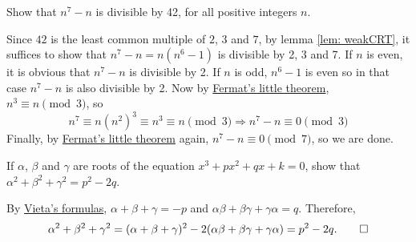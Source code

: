 \begin{question}
    Show that $n^7 - n$ is divisible by 42, for all positive integers $n$.
\end{question}
\begin{solution}
    Since $42$ is the least common multiple of $2$, $3$ and $7$, by lemma
    \ref{lem: weakCRT}, it suffices to show that $n^7 - n = n(n^6 - 1)$ is
    divisible by 2, 3 and 7. If $n$ is even, it is obvious that $n^7 - n$ is
    divisible by 2. If $n$ is odd, $n^6 - 1$ is even so in that case $n^7 - n$
    is also divisible by 2. Now by \hyperref[thm: FLT]{Fermat's little theorem},
    $n^3 \equiv n \pmod{3}$, so
    \[ n^7 \equiv n(n^2)^3 \equiv n^3 \equiv n \pmod{3} \Longrightarrow n^7 - n
    \equiv 0 \pmod{3}\]
    Finally, by \hyperref[thm: FLT]{Fermat's little theorem} again, $n^7 - n
    \equiv 0 \pmod{7}$, so we are done.
\end{solution}

\begin{question}
    If $\alpha$, $\beta$ and $\gamma$ are roots of the equation $x^3 + px^2 +
    qx + k = 0$, show that $\alpha^2 + \beta^2 + \gamma^2 = p^2 - 2q$.
\end{question}
\begin{solution}
    By \hyperref[thm: vieta]{Vieta's formulas}, $\alpha + \beta + \gamma = -p$
    and $\alpha \beta + \beta \gamma + \gamma \alpha = q$. Therefore,
    \[ \alpha^2 + \beta^2 + \gamma^2 = (\alpha + \beta + \gamma)^2 - 2(\alpha
    \beta + \beta \gamma + \gamma \alpha) = p^2 - 2q. \qedhere\]
\end{solution}
